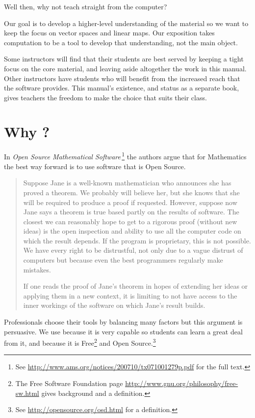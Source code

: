 Well then, why 
not teach straight from the computer?

Our goal is to 
develop a higher-level understanding of the material so we want to  
keep the focus on vector spaces and linear maps.
Our exposition takes computation to be
a tool to develop that understanding, not the main object.

Some instructors will find 
that their students are best served by
keeping a tight focus on the
core material, and leaving aside altogether 
the work in this manual. 
Other instructors
have students who will benefit from the increased reach that the software
provides.
This manual's existence, and status as a separate book, gives teachers the 
freedom to make the choice that suits their class.


\section{Why \Sage?}
In 
\textit{Open Source Mathematical Software\,}\citep{JoynerStein07}\footnote{See 
\protect\url{http://www.ams.org/notices/200710/tx071001279p.pdf} for the 
full text.}
the authors argue that for Mathematics the best way forward
is to use software that is Open Source.

\begin{quotation}\small
Suppose Jane is a well-known mathematician who announces
she has proved a theorem. We probably will believe
her, but she knows that she will be required to produce
a proof if requested. However, suppose now Jane says a
theorem is true based partly on the results of software. The
closest we can reasonably hope to get to a rigorous proof
(without new ideas) is the open inspection and ability to use
all the computer code on which the result depends. If the
program is proprietary, this is not possible. We have every
right to be distrustful, not only due to a vague distrust of
computers but because even the best programmers regularly
make mistakes.

If one reads the proof of Jane’s theorem in hopes of
extending her ideas or applying them in a new context, it
is limiting to not have access to the inner workings of the
software on which Jane’s result builds.
\end{quotation}  
Professionals choose their tools by balancing many factors but
this argument is persuasive.
We use \Sage{} because it is very capable 
so students can 
learn a great deal from it,
and because it is 
Free\footnote{The Free Software Foundation page 
\protect\url{http://www.gnu.org/philosophy/free-sw.html} 
gives background and a definition.} 
and Open Source.\footnote{See \protect\url{http://opensource.org/osd.html} 
for a definition.} 



